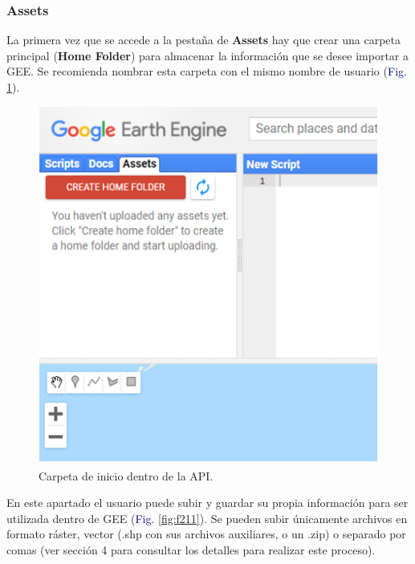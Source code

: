 \documentclass[
  12pt,
  letterpaper,
  twoside]{book}
\begin{document}
\hypertarget{assets}{%
\subsubsection*{Assets}\label{assets}}

La primera vez que se accede a la pestaña de \textbf{Assets} hay que crear una carpeta principal (\textbf{Home Folder}) para almacenar la información que se desee importar a GEE. Se recomienda nombrar esta carpeta con el mismo nombre de usuario (\textcolor{darkblue}{Fig.} \ref{fig:f210}).

\begin{figure}[H]

{\centering \includegraphics[width=0.8\linewidth]{Img/homeFolder} 

}

\caption{Carpeta de inicio dentro de la API.}\label{fig:f210}
\end{figure}

En este apartado el usuario puede subir y guardar su propia información para ser utilizada dentro de GEE (\textcolor{darkblue}{Fig.} \ref{fig:f211}). Se pueden subir únicamente archivos en formato ráster, vector (.shp con sus archivos auxiliares, o un .zip) o separado por comas (ver sección 4 para consultar los detalles para realizar este proceso).
\end{document}
